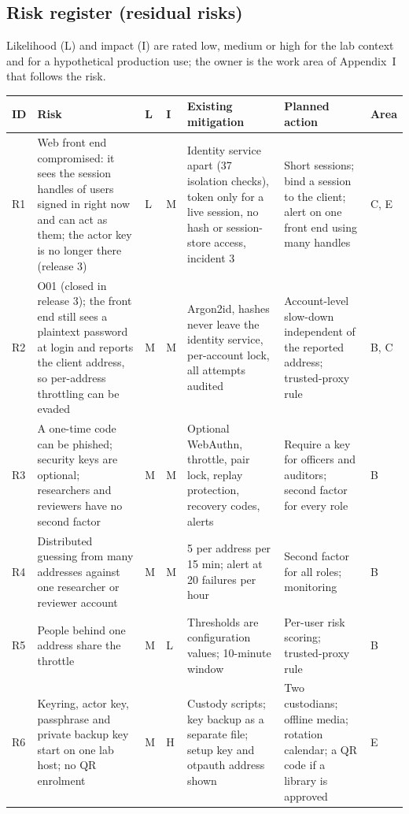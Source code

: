 \documentclass[10pt,a4paper]{article}
\newcommand{\tcap}[1]{\captionof{table}{#1}\nopagebreak[4]\vspace{-3pt}}
\begin{document}
\subsection{Risk register (residual risks)}
Likelihood (L) and impact (I) are rated low, medium or high for the lab context and for a hypothetical production use; the owner is the work area of Appendix~I that follows the risk.
\tcap{Risk register}
\begin{center}\scriptsize
\begin{longtable}{@{}L{0.6cm}L{3.6cm}L{0.7cm}L{0.7cm}L{4.4cm}L{4.4cm}L{0.9cm}@{}}
\toprule\textbf{ID} & \textbf{Risk} & \textbf{L} & \textbf{I} & \textbf{Existing mitigation} & \textbf{Planned action} & \textbf{Area}\\\midrule\endhead
R1 & Web front end compromised: it sees the session handles of users signed in right now and can act as them; the actor key is no longer there (release 3) & L & M & Identity service apart (37 isolation checks), token only for a live session, no hash or session-store access, incident 3 & Short sessions; bind a session to the client; alert on one front end using many handles & C, E\\
R2 & O01 (closed in release 3); the front end still sees a plaintext password at login and reports the client address, so per-address throttling can be evaded & M & M & Argon2id, hashes never leave the identity service, per-account lock, all attempts audited & Account-level slow-down independent of the reported address; trusted-proxy rule & B, C\\
R3 & A one-time code can be phished; security keys are optional; researchers and reviewers have no second factor & M & M & Optional WebAuthn, throttle, pair lock, replay protection, recovery codes, alerts & Require a key for officers and auditors; second factor for every role & B\\
R4 & Distributed guessing from many addresses against one researcher or reviewer account & M & M & 5 per address per 15 min; alert at 20 failures per hour & Second factor for all roles; monitoring & B\\
R5 & People behind one address share the throttle & M & L & Thresholds are configuration values; 10-minute window & Per-user risk scoring; trusted-proxy rule & B\\
R6 & Keyring, actor key, passphrase and private backup key start on one lab host; no QR enrolment & M & H & Custody scripts; key backup as a separate file; setup key and otpauth address shown & Two custodians; offline media; rotation calendar; a QR code if a library is approved & E\\

\end{longtable}
\end{center}
\end{document}
